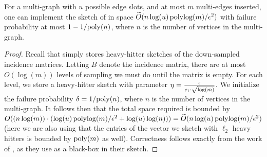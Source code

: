 \documentclass{article}
\begin{document}
\begin{claim}
    For a multi-graph with $u$ possible edge slots, and at most $m$ multi-edges inserted, one can implement the sketch of \cite{KLMMS14} in space $\widetilde{O}(n \log(u) \operatorname{polylog}(m) / \epsilon^2)$ with failure probability at most $1 - 1 / \mathrm{poly}(n)$, where $n$ is the number of vertices in the multi-graph. 
\end{claim}

\begin{proof}
    Recall that \cite{KLMMS14} simply stores heavy-hitter sketches of the down-sampled incidence matrices. Letting $B$ denote the incidence matrix, there are at most $O(\log(m))$ levels of sampling we must do until the matrix is empty. For each level, we store a heavy-hitter sketch with parameter $\eta = \frac{\epsilon}{c_1 \cdot \sqrt{\log(m)}}$. We initialize the failure probability $\delta = 1/\mathrm{poly}(n)$, where $n$ is the number of vertices in the multi-graph. It follows then that the total space required is bounded by $O((n \log(m) ) \cdot (\log(u) \operatorname{polylog}(m) / \epsilon^2 + \log(u) \log(n))) = \widetilde{O}(n \log(u) \operatorname{polylog}(m) / \epsilon^2)$ (here we are also using that the entries of the vector we sketch with $\ell_2$ heavy hitters is bounded by $\mathrm{poly}(m)$ as well). Correctness follows exactly from the work of \cite{KLMMS14}, as they use  as a black-box in their sketch.
\end{proof}
\end{document}
